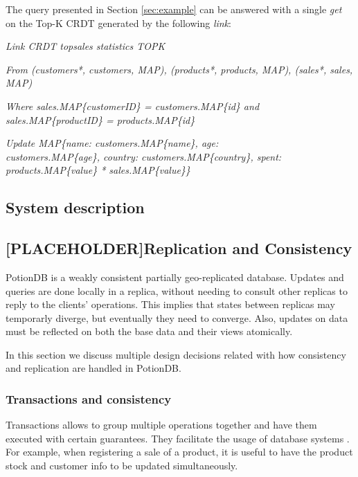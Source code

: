 \documentclass{vldb}
\newcommand{\emphvspace}{0.5\baselineskip}
\newcommand{\firstblockemph}[1]{\vspace{\emphvspace}\hspace{2em}\emph{#1}}
\newcommand{\middleblockemph}[1]{\hspace{2em}\emph{#1}}
\newcommand{\lastblockemph}[1]{\hspace{2em}\emph{#1}\vspace{\emphvspace}}
\begin{document}
The query presented in Section \ref{sec:example} can be answered with a single \emph{get} on the Top-K CRDT generated by the following \emph{link}:

\firstblockemph{Link CRDT topsales statistics TOPK}

\middleblockemph{From (customers*, customers, MAP), (products*, products, MAP), (sales*, sales, MAP)}

\middleblockemph{Where sales.MAP\{customerID\} = customers.MAP\{id\} \emph{and}  sales.MAP\{productID\} = products.MAP\{id\}}

\lastblockemph{Update MAP\{name: customers.MAP\{name\}, age: \\ customers.MAP\{age\}, country: customers.MAP\{country\}, spent: products.MAP\{value\} * sales.MAP\{value\}\}}

\subsection{System description}

\subsection{[PLACEHOLDER]Replication and Consistency}

PotionDB is a weakly consistent partially geo-replicated database.
Updates and queries are done locally in a replica, without needing to consult other replicas to reply to the clients' operations.
This implies that states between replicas may temporarly diverge, but eventually they need to converge.
Also, updates on data must be reflected on both the base data and their views atomically.

In this section we discuss multiple design decisions related with how consistency and replication are handled in PotionDB.

\subsubsection{Transactions and consistency}

Transactions allows to group multiple operations together and have them executed with certain guarantees.
They facilitate the usage of database systems \cite{???}.
For example, when registering a sale of a product, it is useful to have the product stock and customer info to be updated simultaneously. %
\end{document}
